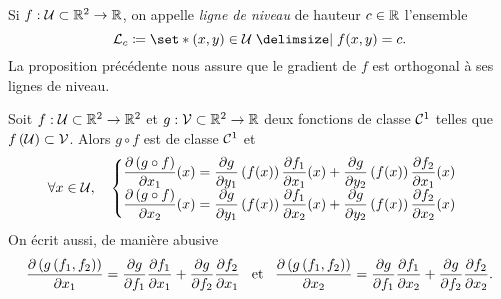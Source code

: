 \documentclass{magnolia}
\begin{document}
\begin{remarqueUnique}
\remarque Si $f:\mathcal{U}\subset\mathbb{R}^2\to\mathbb{R}$, on appelle \emph{ligne de niveau} de hauteur $c\in\mathbb{R}$
  l'ensemble
  \[\mathcal{L}_c\defeq\enstq{(x,y)\in\mathcal{U}}{f(x,y)=c}.\]
  La proposition précédente nous assure que le gradient de $f$ est orthogonal à ses lignes de niveau.
\end{remarqueUnique}

\begin{proposition}
Soit $f:\mathcal{U}\subset\mathbb{R}^2\to\mathbb{R}^2$ et $g:\mathcal{V}\subset\mathbb{R}^2\to\mathbb{R}$ deux
fonctions de classe $\mathcal{C}^{1}$ telles que
$f\left(\mathcal{U}\right)\subset\mathcal{V}$. Alors $g\circ f$ est de classe
$\mathcal{C}^{1}$ et
\[\forall x\in\mathcal{U} ,\quad
  \begin{cases}
  \displaystyle\frac{\partial \left(g\circ f\right)}{\partial x_1}(x) = \displaystyle\frac{\partial g}{\partial y_1}\left(f(x)\right)
  \displaystyle\frac{\partial f_1}{\partial x_1}(x)+\displaystyle\frac{\partial g}{\partial y_2}\left(f(x)\right)
  \displaystyle\frac{\partial f_2}{\partial x_1}(x) &\\
  \displaystyle\frac{\partial \left(g\circ f\right)}{\partial x_2}(x) = \displaystyle\frac{\partial g}{\partial y_1}\left(f(x)\right)
  \displaystyle\frac{\partial f_1}{\partial x_2}(x)+\displaystyle\frac{\partial g}{\partial y_2}\left(f(x)\right)
  \displaystyle\frac{\partial f_2}{\partial x_2}(x) &
  \end{cases}\]
  On écrit aussi, de manière abusive
  \[\displaystyle\frac{\partial \left(g\left(f_1,f_2\right)\right)}{\partial x_1}=\frac{\partial g}{\partial f_1}\frac{\partial f_1}{\partial x_1}
    +\frac{\partial g}{\partial f_2}\frac{\partial f_2}{\partial x_1} \quad\!\text{et}\quad\!
    \displaystyle\frac{\partial \left(g\left(f_1,f_2\right)\right)}{\partial x_2}=\frac{\partial g}{\partial f_1}\frac{\partial f_1}{\partial x_2}
    +\frac{\partial g}{\partial f_2}\frac{\partial f_2}{\partial x_2}.\]
\end{proposition}
\end{document}
